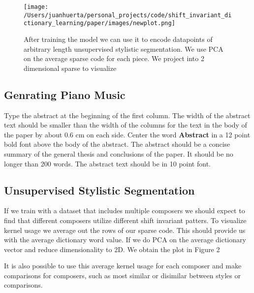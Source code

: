 \documentclass[11pt,a4paper]{article}
\begin{document}

\begin{figure*}[ht]
  \texttt{[image: /Users/juanhuerta/personal\_projects/code/shift\_invariant\_dictionary\_learning/paper/images/newplot.png]}
  \caption{After training the model we can use it to encode datapoints of arbitrary length unsupervised stylistic segmentation. We use PCA on the average sparse code for each piece. We project into 2 dimensional sparse to visualize }
  \label{fig:boat1}
\end{figure*}

\subsection{Genrating Piano Music }

Type the abstract at the beginning of the first
column. The width of the abstract text should be smaller than the
width of the columns for the text in the body of the paper by about
0.6 cm on each side. Center the word \textbf{Abstract} in a 12 point bold
font above the body of the abstract. The abstract should be a concise
summary of the general thesis and conclusions of the paper. It should
be no longer than 200 words. The abstract text should be in 10 point font.



\subsection{Unsupervised Stylistic Segmentation }

If we train with a dataset that includes multiple composers we should expect to find that different composers utilize different shift invariant patters. To visualize kernel usage we average out the rows of our sparse code. This should provide us with the average dictionary word value. If we do PCA on the average dictionary vector and reduce dimensionality to 2D. We obtain the plot in Figure 2

It is also possible to use this average kernel usage for each composer and make comparisons for composers, such as most similar or disimilar between styles or comparisons. 
\end{document}
